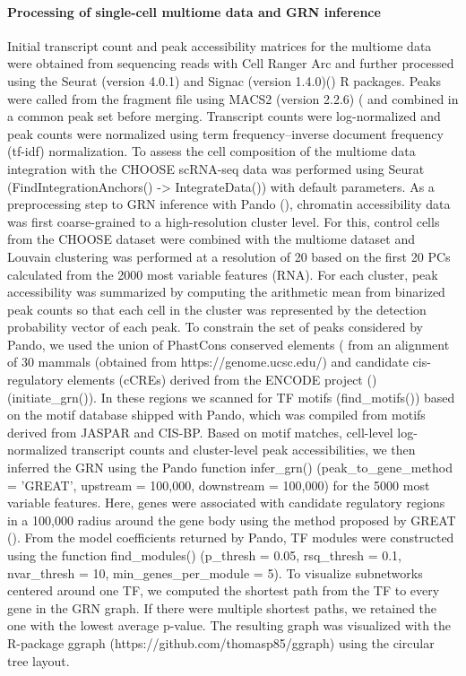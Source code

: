 \paragraph{Processing of single-cell multiome data and GRN inference}
Initial transcript count and peak accessibility matrices for the multiome data were obtained from sequencing reads with Cell Ranger Arc and further processed using the Seurat (version 4.0.1) and Signac (version 1.4.0)(\cite{stuart_multimodal_2020}) R packages. Peaks were called from the fragment file using MACS2 (version 2.2.6) (\cite{feng_identifying_2012} and combined in a common peak set before merging. Transcript counts were log-normalized and peak counts were normalized using term frequency–inverse document frequency (tf-idf) normalization. To assess the cell composition of the multiome data integration with the CHOOSE scRNA-seq data was performed using Seurat (FindIntegrationAnchors() -> IntegrateData()) with default parameters. As a preprocessing step to GRN inference with Pando (\cite{fleck_resolving_2021}), chromatin accessibility data was first coarse-grained to a high-resolution cluster level. For this, control cells from the CHOOSE dataset were combined with the multiome dataset and Louvain clustering was performed at a resolution of 20 based on the first 20 PCs calculated from the 2000 most variable features (RNA). For each cluster, peak accessibility was summarized by computing the arithmetic mean from binarized peak counts so that each cell in the cluster was represented by the detection probability vector of each peak. To constrain the set of peaks considered by Pando, we used the union of PhastCons conserved elements (\cite{siepel_evolutionarily_2005} from an alignment of 30 mammals (obtained from https://genome.ucsc.edu/) and candidate cis-regulatory elements (cCREs) derived from the ENCODE project (\cite{encode_project_consortium_expanded_2020})(initiate\_grn()). In these regions we scanned for TF motifs (find\_motifs()) based on the motif database shipped with Pando, which was compiled from motifs derived from JASPAR and CIS-BP. Based on motif matches, cell-level log-normalized transcript counts and cluster-level peak accessibilities, we then inferred the GRN using the Pando function infer\_grn() (peak\_to\_gene\_method = 'GREAT', upstream = 100,000, downstream = 100,000) for the 5000 most variable features. Here, genes were associated with candidate regulatory regions in a 100,000 radius around the gene body using the method proposed by GREAT (\cite{mclean_great_2010}). From the model coefficients returned by Pando, TF modules were constructed using the function find\_modules() (p\_thresh = 0.05,  rsq\_thresh = 0.1, nvar\_thresh = 10, min\_genes\_per\_module = 5). To visualize subnetworks centered around one TF, we computed the shortest path from the TF to every gene in the GRN graph. If there were multiple shortest paths, we retained the one with the lowest average p-value. The resulting graph was visualized with the R-package ggraph (https://github.com/thomasp85/ggraph) using the circular tree layout.

